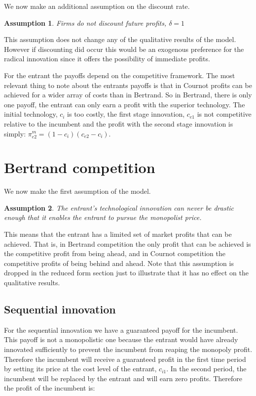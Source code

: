\documentclass[11pt]{article}
\newtheorem{assumption}{Assumption}
\begin{document}
We now make an additional assumption on the discount rate. 

\begin{assumption}
Firms do not discount future profits, $\delta=1$
\end{assumption}

This assumption does not change any of the qualitative results of the model. However if discounting did occur this would be an exogenous preference for the radical innovation since it offers the possibility of immediate profits. 

For the entrant the payoffs depend on the competitive framework. The most relevant thing to note about the entrants payoffs is that in Cournot profits can be achieved for a wider array of costs than in Bertrand. So in Bertrand, there is only one payoff, the entrant can only earn a profit with the superior technology. The initial technology, $c_i$ is too costly, the first stage innovation, $c_{e1}$ is not competitive relative to the incumbent and the profit with the second stage innovation is simply: $\pi_{e2}^m=(1-c_i)(c_{e2}-c_i)$.

\section*{Bertrand competition}

We now make the first assumption of the model.  

\begin{assumption}
The entrant's technological innovation can never be drastic enough that it enables the entrant to pursue the monopolist price. 
\end{assumption}

This means that the entrant has a limited set of market profits that can be achieved. That is, in Bertrand competition the only profit that can be achieved is the competitive profit from being ahead, and in Cournot competition the competitive profits of being behind and ahead. Note that this assumption is dropped in the reduced form section just to illustrate that it has no effect on the qualitative results.

\subsection*{Sequential innovation}

For the sequential innovation we have a guaranteed payoff for the incumbent. This payoff is not a monopolistic one because the entrant would have already innovated sufficiently to prevent the incumbent from reaping the monopoly profit. Therefore the incumbent will receive a guaranteed profit in the first time period by setting its price at the cost level of the entrant, $c_{i1}$. In the second period, the incumbent will be replaced by the entrant and will earn zero profits. Therefore the profit of the incumbent is:
\end{document}
